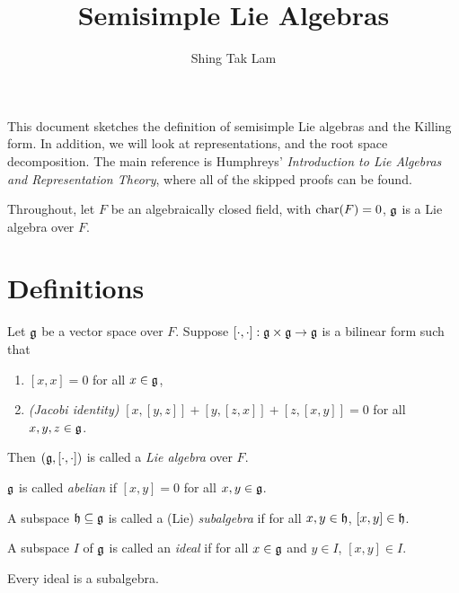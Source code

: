 \documentclass{article}
\title{Semisimple Lie Algebras}
\author{Shing Tak Lam}
\begin{document}
\maketitle

This document sketches the definition of semisimple Lie algebras and the Killing form. In addition, we will look at representations, and the root space decomposition. The main reference is Humphreys' \emph{Introduction to Lie Algebras and Representation Theory}, where all of the skipped proofs can be found.

Throughout, let \(F\) be an algebraically closed field, with \(\operatorname{char}(F) = 0\), \(\mathfrak{g}\) is a Lie algebra over \(F\).

\section{Definitions}

\begin{definition}
     Let \(\mathfrak{g}\) be a vector space over \(F\). Suppose \([\cdot, \cdot] : \mathfrak{g} \times \mathfrak{g} \to \mathfrak{g}\) is a bilinear form such that
    \begin{enumerate}
        \item \([x, x] = 0\) for all \(x \in \mathfrak{g}\),
        \item \emph{(Jacobi identity)} \([x, [y, z]] + [y, [z, x]] + [z, [x, y]] = 0\) for all \(x, y, z \in \mathfrak{g}\). 
    \end{enumerate}

    Then \((\mathfrak{g}, [\cdot, \cdot])\) is called a \emph{Lie algebra} over \(F\).
\end{definition}

\begin{definition}
    [abelian] \(\mathfrak{g}\) is called \emph{abelian} if \([x, y] = 0\) for all \(x, y \in \mathfrak{g}\).
\end{definition}

\begin{definition}
    [subalgebra] A subspace \(\mathfrak{h} \subseteq \mathfrak{g}\) is called a (Lie) \emph{subalgebra} if for all \(x, y \in \mathfrak{h}\), \([x, y] \in \mathfrak{h}\).
\end{definition}

\begin{definition}
    [Ideal] A subspace \(I\) of \(\mathfrak{g}\) is called an \emph{ideal} if for all \(x \in \mathfrak{g}\) and \(y \in I\), \([x, y] \in I\).
\end{definition}

\begin{proposition}
    Every ideal is a subalgebra.
\end{proposition}
\end{document}
